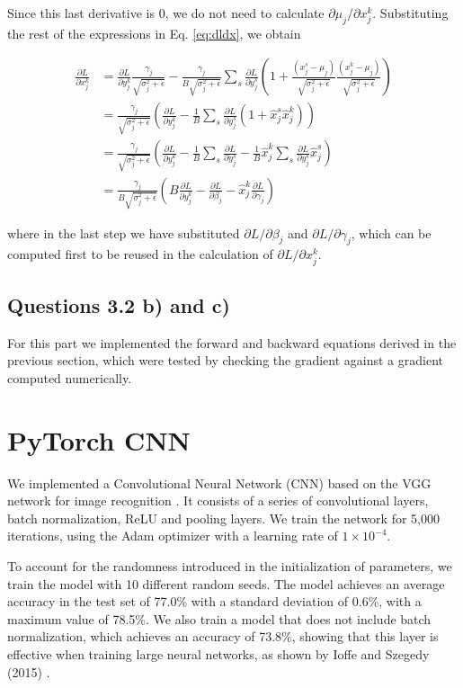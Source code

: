 \documentclass{article}
\newcommand{\pd}[2]{\frac{\partial #1}{\partial #2}}
\begin{document}
Since this last derivative is 0, we do not need to calculate $\partial\mu_j/\partial x_j^k$. Substituting the rest of the expressions in Eq. \ref{eq:dldx}, we obtain

\begin{align*}
\pd{L}{x_j^k} &= \pd{L}{y_j^k}\frac{\gamma_j}{\sqrt{\sigma_j^2 + \epsilon}} -\frac{\gamma_j}{B\sqrt{\sigma_j^2 + \epsilon}}\sum_s \pd{L}{y_j^s}\left(1 + \frac{(x_j^s - \mu_j)}{\sqrt{\sigma_j^2 + \epsilon}}\frac{(x_j^k - \mu_j)}{\sqrt{\sigma_j^2 + \epsilon}}  \right) \\
&=
\frac{\gamma_j}{\sqrt{\sigma_j^2 + \epsilon}}\left(\pd{L}{y_j^k} - \frac{1}{B}\sum_s \pd{L}{y_j^s} (1 + \hat{x}_j^s \hat{x}_j^k) \right) \\
&=
\frac{\gamma_j}{\sqrt{\sigma_j^2 + \epsilon}}\left(\pd{L}{y_j^k} - \frac{1}{B}\sum_s \pd{L}{y_j^s} - \frac{1}{B}\hat{x}_j^k\sum_s \pd{L}{y_j^s}\hat{x}_j^s \right) \\
&=
\frac{\gamma_j}{B\sqrt{\sigma_j^2 + \epsilon}}\left(B\pd{L}{y_j^k} - \pd{L}{\beta_j} - \hat{x}_j^k \pd{L}{\gamma_j} \right)
\end{align*}

where in the last step we have substituted $\partial L/\partial\beta_j$ and $\partial L/\partial\gamma_j$, which can be computed first to be reused in the calculation of $\partial L/\partial x_j^k$.

\subsection*{Questions 3.2 b) and c)}

For this part we implemented the forward and backward equations derived in the previous section, which were tested by checking the gradient against a gradient computed numerically.

\section{PyTorch CNN}

We implemented a Convolutional Neural Network (CNN) based on the VGG network for image recognition \cite{simonyan2014vgg}. It consists of a series of convolutional layers, batch normalization, ReLU and pooling layers. We train the network for 5,000 iterations, using the Adam optimizer with a learning rate of $1\times 10^{-4}$.

To account for the randomness introduced in the initialization of parameters, we train the model with 10 different random seeds. The model achieves an average accuracy in the test set of 77.0\% with a standard deviation of 0.6\%, with a maximum value of 78.5\%. We also train a model that does not include batch normalization, which achieves an accuracy of 73.8\%, showing that this layer is effective when training large neural networks, as shown by Ioffe and Szegedy (2015) \cite{ioffe2015batchnorm}.
\end{document}
